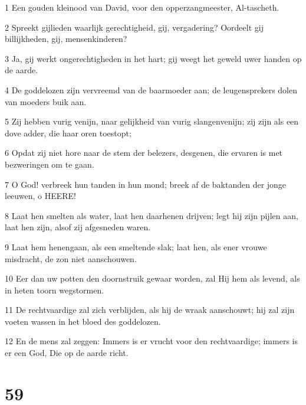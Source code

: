 \par 1 Een gouden kleinood van David, voor den opperzangmeester, Al-tascheth.
\par 2 Spreekt gijlieden waarlijk gerechtigheid, gij, vergadering? Oordeelt gij billijkheden, gij, mensenkinderen?
\par 3 Ja, gij werkt ongerechtigheden in het hart; gij weegt het geweld uwer handen op de aarde.
\par 4 De goddelozen zijn vervreemd van de baarmoeder aan; de leugensprekers dolen van moeders buik aan.
\par 5 Zij hebben vurig venijn, naar gelijkheid van vurig slangenvenijn; zij zijn als een dove adder, die haar oren toestopt;
\par 6 Opdat zij niet hore naar de stem der belezers, desgenen, die ervaren is met bezweringen om te gaan.
\par 7 O God! verbreek hun tanden in hun mond; breek af de baktanden der jonge leeuwen, o HEERE!
\par 8 Laat hen smelten als water, laat hen daarhenen drijven; legt hij zijn pijlen aan, laat hen zijn, alsof zij afgesneden waren.
\par 9 Laat hem henengaan, als een smeltende slak; laat hen, als ener vrouwe misdracht, de zon niet aanschouwen.
\par 10 Eer dan uw potten den doornstruik gewaar worden, zal Hij hem als levend, als in heten toorn wegstormen.
\par 11 De rechtvaardige zal zich verblijden, als hij de wraak aanschouwt; hij zal zijn voeten wassen in het bloed des goddelozen.
\par 12 En de mens zal zeggen: Immers is er vrucht voor den rechtvaardige; immers is er een God, Die op de aarde richt.

\chapter{59}

